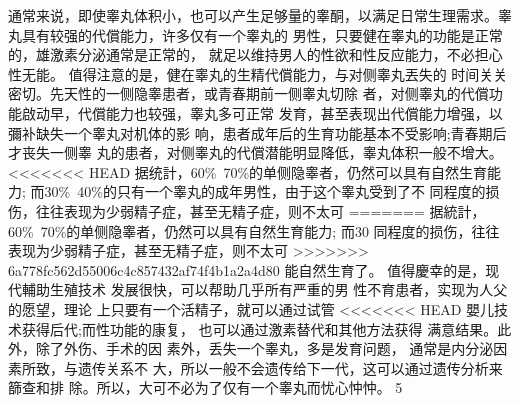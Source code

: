 \documentclass[12pt,UTF8]{ctexbook}
\begin{document}
通常来说，即使睾丸体积小，也可以产生足够量的睾酮，以满足日常生理需求。睾丸具有较强的代償能力，许多仅有一个睾丸的
男性，只要健在睾丸的功能是正常的，雄激素分泌通常是正常的，
就足以维持男人的性欲和性反应能力，不必担心性无能。
值得注意的是，健在睾丸的生精代償能力，与对侧睾丸丟失的
时间关关密切。先天性的一侧隐睾患者，或青春期前一侧睾丸切除
者，对侧睾丸的代償功能啟动早，代償能力也较强，睾丸多可正常
发育，甚至表现出代償能力增强，以彌补缺失一个睾丸对机体的影
响，患者成年后的生育功能基本不受影响;青春期后才丧失一侧睾
丸的患者，对侧睾丸的代償潜能明显降低，睾丸体积一般不增大。
<<<<<<< HEAD
据统計，60\%~70\%的单侧隐睾者，仍然可以具有自然生育能力;
而30\%~40\%的只有一个睾丸的成年男性，由于这个睾丸受到了不
同程度的损伤，往往表现为少弱精子症，甚至无精子症，则不太可
=======
据統計，60\%~70\%的单侧隐睾者，仍然可以具有自然生育能力;
而30%
同程度的损伤，往往表现为少弱精子症，甚至无精子症，则不太可
>>>>>>> 6a778fc562d55006c4c857432af74f4b1a2a4d80
能自然生育了。
值得慶幸的是，现代輔助生殖技术
发展很快，可以帮助几乎所有严重的男
性不育患者，实现为人父的愿望，理论
上只要有一个活精子，就可以通过试管
<<<<<<< HEAD
嬰儿技术获得后代;而性功能的康复，
也可以通过激素替代和其他方法获得
满意结果。此外，除了外伤、手术的因
素外，丢失一个睾丸，多是发育问题，
通常是内分泌因素所致，与遗传关系不
大，所以一般不会遗传给下一代，这可以通过遗传分析来篩查和排
除。所以，大可不必为了仅有一个睾丸而忧心忡忡。
5
\end{document}
